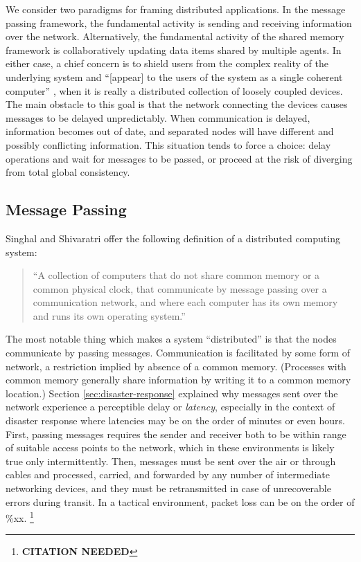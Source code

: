 \documentclass[]             %
{NASA}                       %
\theoremstyle{definition}
\newcommand{\citationneeded}{\footnote{\textbf{CITATION NEEDED}}}
\begin{document}
We consider two paradigms for framing distributed applications. In the
message passing framework, the fundamental activity is sending and
receiving information over the network. Alternatively, the fundamental
activity of the shared memory framework is collaboratively updating
data items shared by multiple agents. In either case, a chief concern
is to shield users from the complex reality of the underlying system
and ``{[}appear{]} to the users of the system as a single coherent
computer'' \cite{TanenbaumSteen07}, when it is really a distributed
collection of loosely coupled devices. The main obstacle to this goal
is that the network connecting the devices causes messages to be
delayed unpredictably. When communication is delayed, information
becomes out of date, and separated nodes will have different and
possibly conflicting information. This situation tends to force a
choice: delay operations and wait for messages to be passed, or
proceed at the risk of diverging from total global consistency.

\subsection{Message Passing}
\label{ssec:message-passing}

Singhal and Shivaratri \cite{10.5555/562065} offer the following
definition of a distributed computing system:

\begin{quote}
  ``A collection of computers that do not share common memory or a common
  physical clock, that communicate by message passing over a communication
  network, and where each computer has its own memory and runs its own
  operating system.''
\end{quote}
The most notable thing which makes a system ``distributed'' is that
the nodes communicate by passing messages. Communication is
facilitated by some form of network, a restriction implied by absence
of a common memory. (Processes with common memory generally share
information by writing it to a common memory location.) Section
\ref{sec:disaster-response} explained why messages sent over the
network experience a perceptible delay or \emph{latency}, especially
in the context of disaster response where latencies may be on the
order of minutes or even hours. First, passing messages requires the
sender and receiver both to be within range of suitable access points
to the network, which in these environments is likely true only
intermittently. Then, messages must be sent over the air or through
cables and processed, carried, and forwarded by any number of
intermediate networking devices, and they must be retransmitted in
case of unrecoverable errors during transit. In a tactical
environment, packet loss can be on the order of \%xx. \citationneeded
\end{document}
